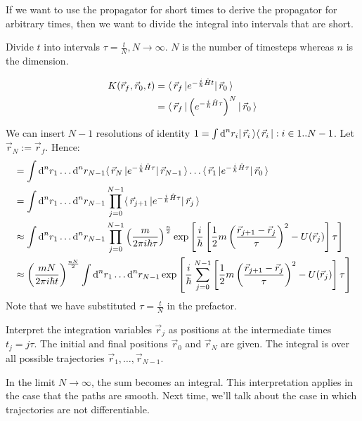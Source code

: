 \documentclass[a4paper]{extarticle}
\newcommand{\ihbar}{\frac{i}{\hbar}}
\newcommand{\propagator}{K(\vec{r}_f, \vec{r}_0, t)}
\begin{document}
If we want to use the propagator for short times to derive the propagator for
arbitrary times, then we want to divide the integral into intervals that are
short.

Divide $t$ into intervals $\tau = \frac{t}{N}, N \to \infty$.
$N$ is the number of timesteps whereas $n$ is the dimension.

\begin{align*}
  \propagator
   & = \bra{\vec{r}_f} e^{-\ihbar \hat{H} t} \ket{\vec{r}_0}
  \\
   & = \bra{\vec{r}_f} \left( e^{-\ihbar \hat{H} \tau} \right)^N \ket{\vec{r}_0}
\end{align*}

We can insert $N - 1$ resolutions of identity $1 = \int \text{d}^n r_{i}
  \lvert\,\vec{r}_{i}\,\rangle \langle\,\vec{r}_{i}\,\rvert : i \in 1 .
  .
  N - 1$.
Let $\vec{r}_N := \vec{r}_f$.
Hence:
\begin{align*}
   & = \int \text{d}^n r_1 \dots \text{d}^n r_{N - 1}
  \bra{\vec{r}_N} e^{-\ihbar \hat{H} \tau} \ket{\vec{r}_{N - 1}} \dots
  \bra{\vec{r}_1} e^{-\ihbar \hat{H} \tau} \ket{\vec{r}_{0}}
  \\
   & = \int \text{d}^n r_1 \dots \text{d}^n r_{N - 1} \prod_{j = 0}^{N - 1}
  \bra{\vec{r}_{j + 1}} e^{-\ihbar \hat{H} \tau} \ket{\vec{r}_{j}}
  \\
   & \approx \int \text{d}^n r_1 \dots \text{d}^n r_{N - 1} \prod_{j = 0}^{N - 1}
  \left(\frac{m}{2\pi i\hbar\tau}\right)^{\frac{n}{2}}
  \exp\left[ \ihbar\left[
      \frac{1}{2}m\left( \frac{\vec{r}_{j + 1} - \vec{r}_{j}}{\tau} \right)^2 -
      U(\vec{r}_j)
      \right] \tau \right]
  \\
   & \approx
  \left(\frac{m N}{2\pi i\hbar t}\right)^{\frac{n N}{2}}
  \int \text{d}^n r_1 \dots \text{d}^n r_{N - 1}
  \exp\left[
    \ihbar\sum_{j = 0}^{N - 1} \left[
      \frac{1}{2}m\left( \frac{\vec{r}_{j + 1} - \vec{r}_{j}}{\tau} \right)^2 -
      U(\vec{r}_j)
      \right] \tau
    \right]
\end{align*}
Note that we have substituted $\tau = \frac{t}{N}$ in the prefactor.

Interpret the integration variables $\vec{r}_j$ as positions at the
intermediate times $t_j = j \tau$.
The initial and final positions $\vec{r}_0$ and $\vec{r}_N$ are given.
The integral is over all possible trajectories $\vec{r}_1, \dots, \vec{r}_{N -
    1}$.

In the limit $N \to \infty$, the sum becomes an integral.
This interpretation applies in the case that the paths are smooth.
Next time, we'll talk about the case in which trajectories are not
differentiable.
\end{document}
